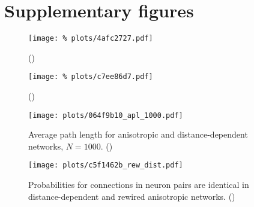 





\section{Supplementary figures}\label{sec:supp_figures}


\begin{figure}[H]
  \centering
  \texttt{[image: \%
    plots/4afc2727.pdf]}
  \caption{()}
  \label{suppfig:rew_stats}
\end{figure}



\begin{figure}[H]
  \centering
  \texttt{[image: \%
    plots/c7ee86d7.pdf]}
  \caption{()}
  \label{suppfig:out_degree}
\end{figure}


\begin{figure}[H]
  \centering
  \texttt{[image: plots/064f9b10\_apl\_1000.pdf]}
  \caption{Average path length for anisotropic and distance-dependent
    networks, $N=1000$. ()} %
  \label{suppfig:small_world}
\end{figure}


\begin{figure}[H]
  \centering
  \texttt{[image: plots/c5f1462b\_rew\_dist.pdf]}
  \caption{Probabilities for connections in neuron pairs are identical
    in distance-dependent and rewired anisotropic
    networks. ()} %
  \label{suppfig:two_neurons_dist_rew}
  \end{figure}


